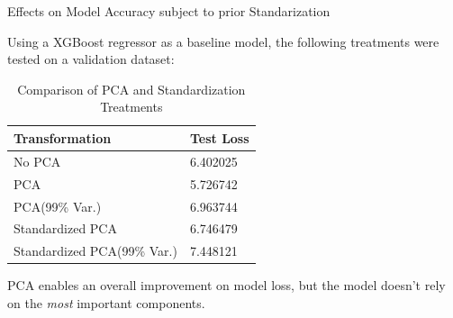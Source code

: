 \documentclass{beamer}
\begin{document}
    \begin{frame}{Effects on Model Accuracy subject to prior Standarization}

        Using a XGBoost regressor as a baseline model, the following treatments were tested on a validation dataset:
        \begin{table}[!htbp]
            \begin{tabular}{ll}
                \hline
                Transformation & Test Loss \\
                \hline
                No PCA &  6.402025 \\
                PCA &  5.726742 \\
                PCA(99\% Var.) &  6.963744 \\
                Standardized PCA &  6.746479 \\
                Standardized PCA(99\% Var.) &  7.448121 \\
                \hline
            \end{tabular}
            \caption{Comparison of PCA and Standardization Treatments}
        \end{table}

        PCA enables an overall improvement on model loss, but the model doesn't rely on the \textit{most} important components.
    \end{frame}
\end{document}
